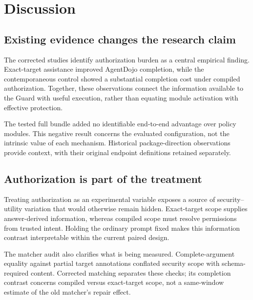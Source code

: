 \section{Discussion}

\label{sec:discussion}

\subsection{Existing evidence changes the research claim}

\label{sec:discussion-existing-evidence-changes-the-research-claim}

The corrected studies identify authorization burden as a central empirical finding. Exact-target assistance improved AgentDojo completion, while the contemporaneous control showed a substantial completion cost under compiled authorization. Together, these observations connect the information available to the Guard with useful execution, rather than equating module activation with effective protection.

The tested full bundle added no identifiable end-to-end advantage over policy modules. This negative result concerns the evaluated configuration, not the intrinsic value of each mechanism. Historical package-direction observations provide context, with their original endpoint definitions retained separately.

\subsection{Authorization is part of the treatment}

\label{sec:discussion-authorization-is-part-of-the-treatment}

Treating authorization as an experimental variable exposes a source of security--utility variation that would otherwise remain hidden. Exact-target scope supplies answer-derived information, whereas compiled scope must resolve permissions from trusted intent. Holding the ordinary prompt fixed makes this information contrast interpretable within the current paired design.

The matcher audit also clarifies what is being measured. Complete-argument equality against partial target annotations conflated security scope with schema-required content. Corrected matching separates these checks; its completion contrast concerns compiled versus exact-target scope, not a same-window estimate of the old matcher's repair effect.

